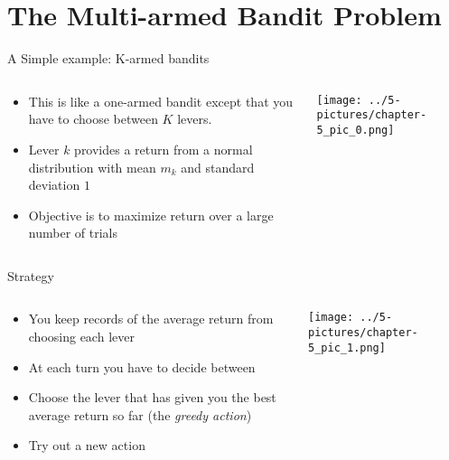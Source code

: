 \documentclass[11pt]{beamer}
\begin{document}
\section{The Multi-armed Bandit Problem}
\begin{frame}{A Simple example: K-armed bandits}
\begin{columns}[T] %
\begin{column}{.48\textwidth}
        \begin{itemize}
		\item This is like a one-armed bandit except that you have to choose between $K$ levers.
		\item Lever $k$ provides a return from a normal distribution with mean $m_k$  and standard deviation $1$
		\item Objective is to maximize return over a large number of trials
        \end{itemize}
\end{column}%
\hfill%
\begin{column}{.48\textwidth}
        \texttt{[image: ../5-pictures/chapter-5\_pic\_0.png]}
\end{column}%
\end{columns}
\end{frame}
\begin{frame}{Strategy}
\begin{columns}[T] %
\begin{column}{.48\textwidth}
        \begin{itemize}
		\item You keep records of the average return from choosing each lever
		\item At each turn you have to decide between
		\item Choose the lever that has given you the best average return so far (the \textit{greedy action})
		\item Try out a new action
        \end{itemize}
\end{column}%
\hfill%
\begin{column}{.48\textwidth}
        \texttt{[image: ../5-pictures/chapter-5\_pic\_1.png]}
\end{column}%
\end{columns}
\end{frame}
\end{document}
